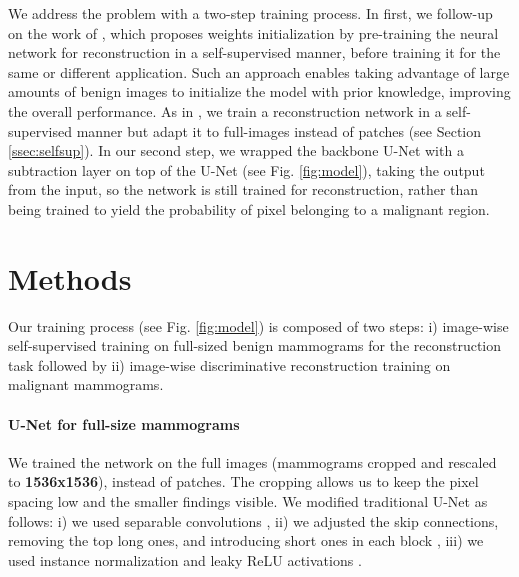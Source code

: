 \documentclass{midl} %
\begin{document}
We address the problem with a two-step training process. In first, we follow-up on the work of \cite{Zhou2019a}, which proposes weights initialization by pre-training the neural network for reconstruction in a self-supervised manner, before training it for the same or different application. Such an approach enables taking advantage of large amounts of benign images to initialize the model with prior knowledge, improving the overall performance. As in  \cite{Zhou2019a}, we train a reconstruction network in a self-supervised manner but adapt it to full-images instead of patches (see Section \ref{ssec:selfsup}). In our second step, we wrapped the backbone U-Net with a subtraction layer on top of the U-Net (see Fig. \ref{fig:model}), taking the output from the input, so the network is still trained for reconstruction, rather than being trained to yield the probability of pixel belonging to a malignant region.




\section{Methods}

Our training process (see Fig. \ref{fig:model}) is composed of two steps: i) image-wise self-supervised training on full-sized benign mammograms for the reconstruction task followed by ii) image-wise discriminative reconstruction training on malignant mammograms. %

\paragraph{U-Net for full-size mammograms} We trained the network on the full images (mammograms cropped and rescaled to \textbf{1536x1536}), instead of patches. The cropping allows us to keep the pixel spacing low and the smaller findings visible. We modified traditional U-Net \cite{Ronneberger2015} as follows: i) we used separable convolutions \cite{Chen2018,Qi2019}, ii)  we adjusted the skip connections, removing the top long ones, and introducing short ones in each block \cite{Drozdzal2016,Szegedy2016}, iii) we used instance normalization and leaky ReLU activations \cite{Isensee2019}. 
\end{document}
